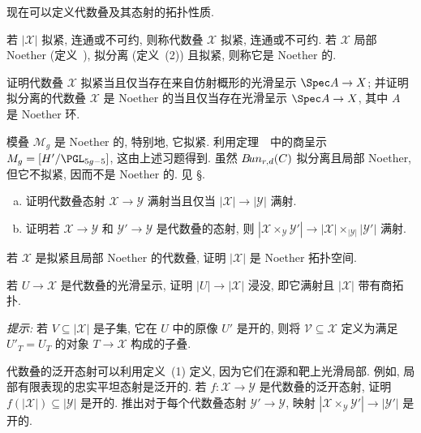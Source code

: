 现在可以定义代数叠及其态射的拓扑性质.
\begin{definition}\label{src:4.3.21}
若 $|\mathcal X|$ 拟紧, 连通或不可约, 则称代数叠 $\mathcal X$ 拟紧, 连通或不可约. 若 $\mathcal X$ 局部 Noether (定义~), 拟分离 (定义~(2)) 且拟紧, 则称它是 Noether 的.
\end{definition}
\begin{exercise}[简单]\label{src:4.3.22}
证明代数叠 $\mathcal X$ 拟紧当且仅当存在来自仿射概形的光滑呈示 $\Spec A\to\mathcal X$; 并证明拟分离的代数叠 $\mathcal X$ 是 Noether 的当且仅当存在光滑呈示 $\Spec A\to\mathcal X$, 其中 $A$ 是 Noether 环.
\end{exercise}
\begin{example}\label{src:4.3.23}
模叠 $\mathcal M_g$ 是 Noether 的, 特别地, 它拟紧. 利用定理~~中的商呈示 $\mathcal M_g=[H'/\PGL_{5g-5}]$, 这由上述习题得到. 虽然 $B\!un_{r,d}(C)$ 拟分离且局部 Noether, 但它不拟紧, 因而不是 Noether 的. 见 \S{}.
\end{example}
\begin{exercise}[简单]\label{src:4.3.24}
\begin{enumerate}[(a)]
\item 证明代数叠态射 $\mathcal X\to\mathcal Y$ 满射当且仅当 $|\mathcal X|\to|\mathcal Y|$ 满射.
\item 证明若 $\mathcal X\to\mathcal Y$ 和 $\mathcal Y'\to\mathcal Y$ 是代数叠的态射, 则 $|\mathcal X\times_{\mathcal Y}\mathcal Y'|\to|\mathcal X|\times_{|\mathcal Y|}|\mathcal Y'|$ 满射.
\end{enumerate}
\end{exercise}
\begin{exercise}[简单]\label{src:4.3.25}
若 $\mathcal X$ 是拟紧且局部 Noether 的代数叠, 证明 $|\mathcal X|$ 是 Noether 拓扑空间.
\end{exercise}
\begin{exercise}[中等]\label{src:4.3.26}
若 $U\to\mathcal X$ 是代数叠的光滑呈示, 证明 $|U|\to|\mathcal X|$ 浸没, 即它满射且 $|\mathcal X|$ 带有商拓扑.

\emph{提示:} 若 $V\subseteq|\mathcal X|$ 是子集, 它在 $U$ 中的原像 $U'$ 是开的, 则将 $\mathcal V\subseteq\mathcal X$ 定义为满足 $U'_T=U_T$ 的对象 $T\to\mathcal X$ 构成的子叠.
\end{exercise}
\begin{exercise}[简单]\label{src:4.3.27}
代数叠的泛开态射可以利用定义~(1) 定义, 因为它们在源和靶上光滑局部. 例如, 局部有限表现的忠实平坦态射是泛开的. 若 $f:\mathcal X\to\mathcal Y$ 是代数叠的泛开态射, 证明 $f(|\mathcal X|)\subseteq|\mathcal Y|$ 是开的. 推出对于每个代数叠态射 $\mathcal Y'\to\mathcal Y$, 映射 $|\mathcal X\times_{\mathcal Y}\mathcal Y'|\to|\mathcal Y'|$ 是开的.
\end{exercise}

